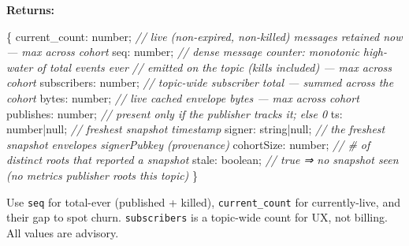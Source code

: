 \documentclass[
  nobib]{tufte-handout}
\newenvironment{Shaded}{}{}
\newcommand{\CommentTok}[1]{\textcolor[rgb]{0.38,0.63,0.69}{\textit{#1}}}
\newcommand{\DataTypeTok}[1]{\textcolor[rgb]{0.56,0.13,0.00}{#1}}
\newcommand{\NormalTok}[1]{#1}
\newcommand{\OperatorTok}[1]{\textcolor[rgb]{0.40,0.40,0.40}{#1}}
\begin{document}
\textbf{Returns:}

\begin{Shaded}
\begin{Highlighting}[]
\NormalTok{\{}
\NormalTok{  current\_count}\OperatorTok{:} \DataTypeTok{number}\OperatorTok{;}       \CommentTok{// live (non{-}expired, non{-}killed) messages retained now — max across cohort}
\NormalTok{  seq}\OperatorTok{:}           \DataTypeTok{number}\OperatorTok{;}       \CommentTok{// dense message counter: monotonic high{-}water of total events ever}
                               \CommentTok{//   emitted on the topic (kills included) — max across cohort}
\NormalTok{  subscribers}\OperatorTok{:}   \DataTypeTok{number}\OperatorTok{;}       \CommentTok{// topic{-}wide subscriber total — summed across the cohort}
\NormalTok{  bytes}\OperatorTok{:}         \DataTypeTok{number}\OperatorTok{;}       \CommentTok{// live cached envelope bytes — max across cohort}
\NormalTok{  publishes}\OperatorTok{:}     \DataTypeTok{number}\OperatorTok{;}       \CommentTok{// present only if the publisher tracks it; else 0}
\NormalTok{  ts}\OperatorTok{:}            \DataTypeTok{number}\OperatorTok{|}\DataTypeTok{null}\OperatorTok{;}  \CommentTok{// freshest snapshot timestamp}
\NormalTok{  signer}\OperatorTok{:}        \DataTypeTok{string}\OperatorTok{|}\DataTypeTok{null}\OperatorTok{;}  \CommentTok{// the freshest snapshot envelope\textquotesingle{}s signerPubkey (provenance)}
\NormalTok{  cohortSize}\OperatorTok{:}    \DataTypeTok{number}\OperatorTok{;}       \CommentTok{// \# of distinct roots that reported a snapshot}
\NormalTok{  stale}\OperatorTok{:}         \DataTypeTok{boolean}\OperatorTok{;}      \CommentTok{// true ⇒ no snapshot seen (no metrics publisher roots this topic)}
\NormalTok{\}}
\end{Highlighting}
\end{Shaded}

Use \texttt{seq} for total-ever (published + killed),
\texttt{current\_count} for currently-live, and their gap to spot churn.
\texttt{subscribers} is a topic-wide count for UX, not billing. All
values are advisory.
\end{document}
